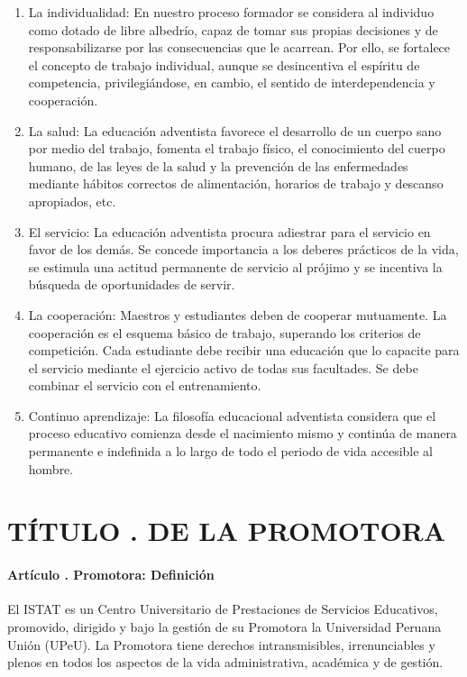 \begin{enumerate}
\item La individualidad: En nuestro proceso formador se considera al individuo como dotado de libre albedrío, capaz de tomar sus propias decisiones y de responsabilizarse por las consecuencias que le acarrean. Por ello, se fortalece el concepto de trabajo individual, aunque se desincentiva el espíritu de competencia, privilegiándose, en cambio, el sentido de interdependencia y cooperación. 
\item La salud: La educación adventista favorece el desarrollo de un cuerpo sano por medio del trabajo, fomenta el trabajo físico, el conocimiento del cuerpo humano, de las leyes de la salud y la prevención de las enfermedades mediante hábitos correctos de alimentación, horarios de trabajo y descanso apropiados, etc. 
\item El servicio: La educación adventista procura adiestrar para el servicio en favor de los demás. Se concede importancia a los deberes prácticos de la vida, se estimula una actitud permanente de servicio al prójimo y se incentiva la búsqueda de oportunidades de servir. 
\item La cooperación: Maestros y estudiantes deben de cooperar mutuamente. La cooperación es el esquema básico de trabajo, superando los criterios de competición. Cada estudiante debe recibir una educación que lo capacite para el servicio mediante el ejercicio activo de todas sus facultades. Se debe combinar el servicio con el entrenamiento. 
\item Continuo aprendizaje: La filosofía educacional adventista considera que el proceso educativo comienza desde el nacimiento mismo y continúa de manera permanente e indefinida a lo largo de todo el periodo de vida accesible al hombre.
\end{enumerate}
\part{TÍTULO . DE LA PROMOTORA}
\addtocounter{ns}{1}
\subsection{Artículo . Promotora: Definición}
\addtocounter{ns}{1}
El ISTAT es un Centro Universitario de Prestaciones de Servicios Educativos, promovido, dirigido y bajo la gestión de su Promotora la Universidad Peruana Unión (UPeU). La Promotora tiene derechos intransmisibles, irrenunciables y plenos en todos los aspectos de la vida administrativa, académica y de gestión. 
